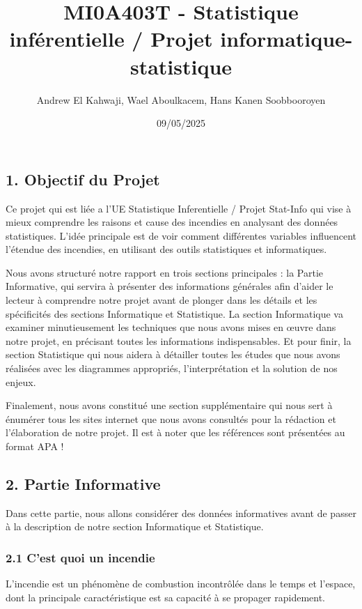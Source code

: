 \documentclass[
]{article}
\title{MI0A403T - Statistique inférentielle / Projet
informatique-statistique}
\author{Andrew El Kahwaji, Wael Aboulkacem, Hans Kanen Soobbooroyen}
\date{09/05/2025}
\begin{document}
\maketitle

{
\setcounter{tocdepth}{3}
\tableofcontents
}
\subsection{1. Objectif du Projet}\label{objectif-du-projet}

Ce projet qui est liée a l'UE Statistique Inferentielle / Projet
Stat-Info qui vise à mieux comprendre les raisons et cause des incendies
en analysant des données statistiques. L'idée principale est de voir
comment différentes variables influencent l'étendue des incendies, en
utilisant des outils statistiques et informatiques.

Nous avons structuré notre rapport en trois sections principales : la
Partie Informative, qui servira à présenter des informations générales
afin d'aider le lecteur à comprendre notre projet avant de plonger dans
les détails et les spécificités des sections Informatique et
Statistique. La section Informatique va examiner minutieusement les
techniques que nous avons mises en œuvre dans notre projet, en précisant
toutes les informations indispensables. Et pour finir, la section
Statistique qui nous aidera à détailler toutes les études que nous avons
réalisées avec les diagrammes appropriés, l'interprétation et la
solution de nos enjeux.

Finalement, nous avons constitué une section supplémentaire qui nous
sert à énumérer tous les sites internet que nous avons consultés pour la
rédaction et l'élaboration de notre projet. Il est à noter que les
références sont présentées au format APA !

\subsection{2. Partie Informative}\label{partie-informative}

Dans cette partie, nous allons considérer des données informatives avant
de passer à la description de notre section Informatique et Statistique.

\subsubsection{2.1 C'est quoi un incendie}\label{cest-quoi-un-incendie}

L'incendie est un phénomène de combustion incontrôlée dans le temps et
l'espace, dont la principale caractéristique est sa capacité à se
propager rapidement.
\end{document}
